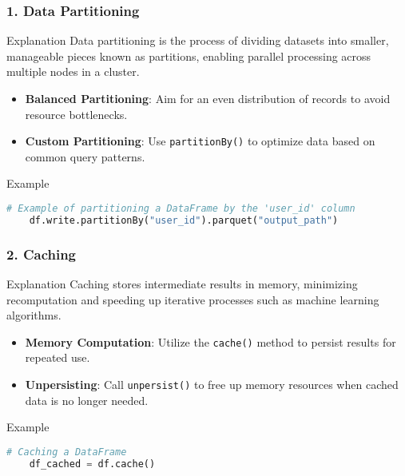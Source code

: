 \documentclass{beamer}
\begin{document}
\begin{frame}
    \frametitle{1. Data Partitioning}
    \begin{block}{Explanation}
        Data partitioning is the process of dividing datasets into smaller, manageable pieces known as partitions, enabling parallel processing across multiple nodes in a cluster.
    \end{block}
    
    \begin{itemize}
        \item \textbf{Balanced Partitioning}: Aim for an even distribution of records to avoid resource bottlenecks.
        \item \textbf{Custom Partitioning}: Use \texttt{partitionBy()} to optimize data based on common query patterns.
    \end{itemize}
    
    \begin{block}{Example}
    \begin{lstlisting}[language=Python]
    # Example of partitioning a DataFrame by the 'user_id' column
    df.write.partitionBy("user_id").parquet("output_path")
    \end{lstlisting}
    \end{block}
\end{frame}

\begin{frame}
    \frametitle{2. Caching}
    \begin{block}{Explanation}
        Caching stores intermediate results in memory, minimizing recomputation and speeding up iterative processes such as machine learning algorithms.
    \end{block}

    \begin{itemize}
        \item \textbf{Memory Computation}: Utilize the \texttt{cache()} method to persist results for repeated use.
        \item \textbf{Unpersisting}: Call \texttt{unpersist()} to free up memory resources when cached data is no longer needed.
    \end{itemize}
    
    \begin{block}{Example}
    \begin{lstlisting}[language=Python]
    # Caching a DataFrame
    df_cached = df.cache()
    \end{lstlisting}
    \end{block}
\end{frame}
\end{document}
